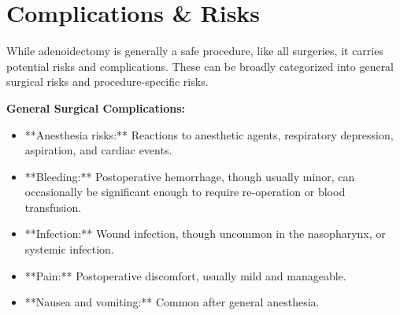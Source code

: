\section*{Complications \& Risks}
While adenoidectomy is generally a safe procedure, like all surgeries, it carries potential risks and complications. These can be broadly categorized into general surgical risks and procedure-specific risks.

\textbf{General Surgical Complications:}
\begin{itemize}
  \item **Anesthesia risks:** Reactions to anesthetic agents, respiratory depression, aspiration, and cardiac events.
  \item **Bleeding:** Postoperative hemorrhage, though usually minor, can occasionally be significant enough to require re-operation or blood transfusion.
  \item **Infection:** Wound infection, though uncommon in the nasopharynx, or systemic infection.
  \item **Pain:** Postoperative discomfort, usually mild and manageable.
  \item **Nausea and vomiting:** Common after general anesthesia.
\end{itemize}

